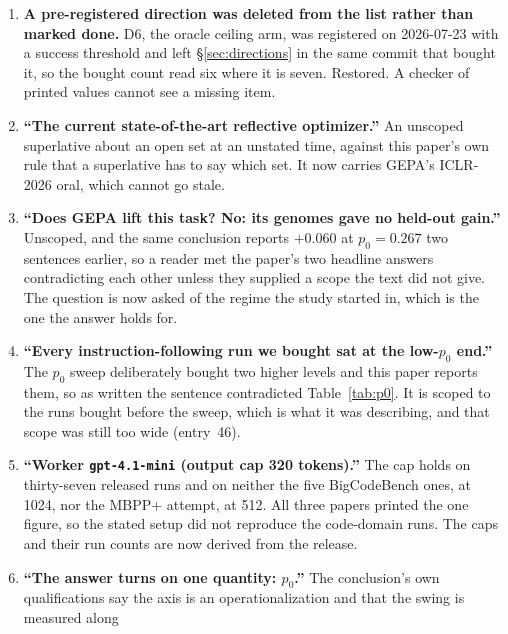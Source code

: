 \documentclass[11pt]{article}
\begin{document}
\begin{enumerate}
    single cell. A three-seed spread is itself uncertain by about a factor of two, so that bar
    can read as precision it has not earned. \S\ref{sec:method} now prints
    the verdicts the rule returns and says why the measured $\sigma(\dd)$ of
    \S\ref{sec:threats} and the five-replicate $t(4)$ of \S\ref{sec:repeat} replace it. Found on
    the final pre-submission read, by applying our own rule to our own cells.
  \item \textbf{A pre-registered direction was deleted from the list rather than marked done.}
    D6, the oracle ceiling arm, was registered on 2026-07-23 with a success threshold and left
    \S\ref{sec:directions} in the same commit that bought it, so the bought count read six where
    it is seven. Restored. A checker of printed values cannot see a missing item.
  \item \textbf{``The current state-of-the-art reflective optimizer.''} An unscoped superlative
    about an open set at an unstated time, against this paper's own rule that a superlative has
    to say which set. It now carries GEPA's ICLR-2026 oral, which cannot go stale.
  \item \textbf{``Does GEPA lift this task? No: its genomes gave no held-out gain.''} Unscoped,
    and the same conclusion reports $+0.060$ at $p_0 = 0.267$ two sentences earlier, so a reader
    met the paper's two headline answers contradicting each other unless they supplied a scope
    the text did not give. The question is now asked of the regime the study started in, which
    is the one the answer holds for.
  \item \textbf{``Every instruction-following run we bought sat at the low-$p_0$ end.''} The
    $p_0$ sweep deliberately bought two higher levels and this paper reports them, so as written
    the sentence contradicted Table~\ref{tab:p0}. It is scoped to the runs bought before the
    sweep, which is what it was describing, and that scope was still too wide (entry~46).
  \item \textbf{``Worker \texttt{gpt-4.1-mini} (output cap 320 tokens).''} The cap holds on
    thirty-seven released runs and on neither the five BigCodeBench ones, at 1024, nor the MBPP+
    attempt, at 512. All three papers printed the one figure, so the stated setup did not reproduce the
    code-domain runs. The caps and their run counts are now derived from the release.
  \item \textbf{``The answer turns on one quantity: $p_0$.''} The conclusion's own
    qualifications say the axis is an operationalization and that the swing is measured along

\end{enumerate}
\end{document}

